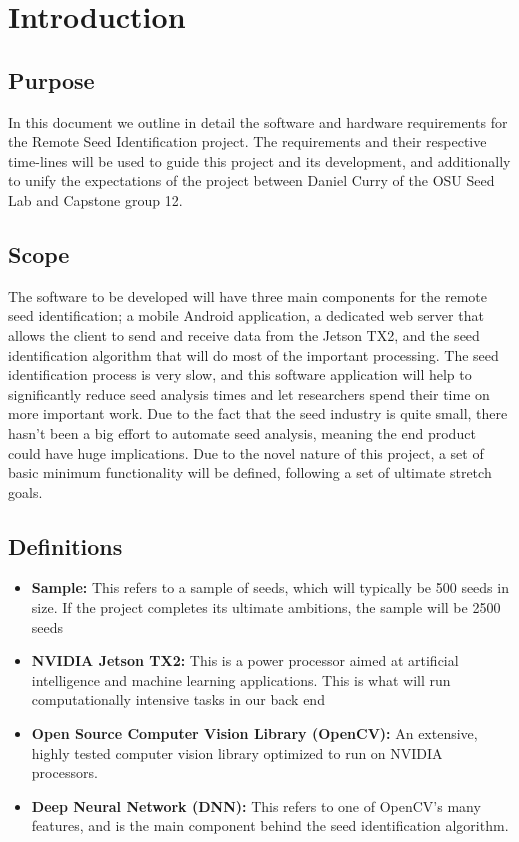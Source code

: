 \documentclass[onecolumn, draftclsnofoot,10pt, compsoc]{IEEEtran}
\begin{document}
\section{Introduction}
\subsection{Purpose}
In this document we outline in detail the software and hardware requirements for the Remote Seed Identification project. The requirements and their respective time-lines will be used to guide this project and its development, and additionally to unify the expectations of the project between Daniel Curry of the OSU Seed Lab and Capstone group 12. 

\subsection{Scope}
The software to be developed will have three main components for the remote seed identification; a mobile Android application, a dedicated web server that allows the client to send and receive data from the Jetson TX2, and the seed identification algorithm that will do most of the important processing. The seed identification process is very slow, and this software application will help to significantly reduce seed analysis times and let researchers spend their time on more important work. Due to the fact that the seed industry is quite small, there hasn't been a big effort to automate seed analysis, meaning the end product could have huge implications. Due to the novel nature of this project, a set of basic minimum functionality will be defined, following a set of ultimate stretch goals.  
\subsection{Definitions}
\begin{itemize}
\item
\textbf{Sample: } This refers to a sample of seeds, which will typically be 500 seeds in size. If the project completes its ultimate ambitions, the sample will be 2500 seeds
\item
\textbf{NVIDIA Jetson TX2: } This is a power processor aimed at artificial intelligence and machine learning applications. This is what will run computationally intensive tasks in our back end
\item
\textbf{Open Source Computer Vision Library (OpenCV): } An extensive, highly tested computer vision library optimized to run on NVIDIA processors.
\item
\textbf{Deep Neural Network (DNN): } This refers to one of OpenCV's many features, and is the main component behind the seed identification algorithm.
\end{itemize}
\end{document}
